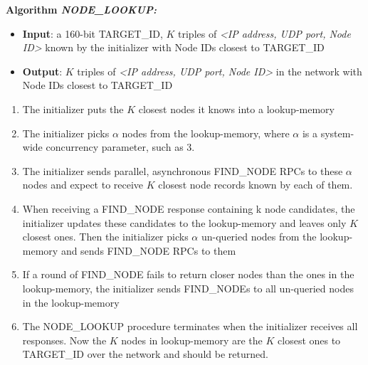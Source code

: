 \noindent \textbf{Algorithm \textit{NODE\_LOOKUP:}}
\begin{itemize}
  \item \textbf{Input}: a 160-bit TARGET\_ID, $K$ triples of \textit{<IP address, UDP port, Node ID>} known by the initializer with Node IDs closest to TARGET\_ID
  \item \textbf{Output}: $K$ triples of \textit{<IP address, UDP port, Node ID>} in the network with Node IDs closest to TARGET\_ID
\end{itemize}
\begin{enumerate}[label=(\roman*)]
  \item The initializer puts the $K$ closest nodes it knows into a lookup-memory
  \item The initializer picks $\alpha$ nodes from the lookup-memory, where $\alpha$ is a system-wide concurrency parameter, such as 3.
  \item The initializer sends parallel, asynchronous FIND\_NODE RPCs to these $\alpha$ nodes and expect to receive $K$ closest node records known by each of them.
  \item When receiving a FIND\_NODE response containing k node candidates, the initializer updates these candidates to the lookup-memory and leaves only $K$ closest ones. Then the initializer picks $\alpha$ un-queried nodes from the lookup-memory and sends FIND\_NODE RPCs to them
  \item If a round of FIND\_NODE fails to return closer nodes than the ones in the lookup-memory, the initializer sends FIND\_NODEs to all un-queried nodes in the lookup-memory
  \item The NODE\_LOOKUP procedure terminates when the initializer receives all responses. Now the $K$ nodes in lookup-memory are the $K$ closest ones to TARGET\_ID over the network and should be returned.
\end{enumerate}

